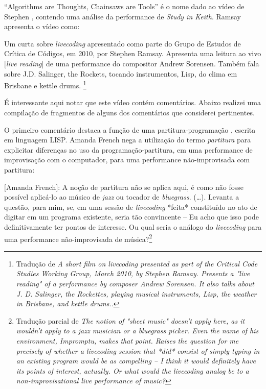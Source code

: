 \documentclass[
	12pt,				%
	openright,			%
	twoside,			%
	a4paper,			%
	english,			%
	french,				%
	spanish,			%
        italian,                        %
	brazil				%
	]{abntex2}
\begin{document}
``Algorithms are Thoughts, Chainsaws are Tools'' é o nome dado ao vídeo de Stephen , contendo uma análise da performance de \emph{Study in Keith}. Ramsay apresenta o vídeo como:

\begin{citacao}
Um curta sobre \emph{livecoding} apresentado como parte do Grupo de Estudos de Crítica de Códigos, em 2010, por Stephen Ramsay. Apresenta uma leitura ao vivo $[$\emph{live reading}$]$ de uma performance do compositor Andrew Sorensen. Também fala sobre J.D. Salinger, the Rockets, tocando instrumentos, Lisp, do clima em Brisbane e kettle drums. \footnote{Tradução de \emph{A short film on livecoding presented as part of the Critical Code Studies Working Group, March 2010, by Stephen Ramsay. Presents a "live reading" of a performance by composer Andrew Sorensen. It also talks about J. D. Salinger, the Rockettes, playing musical instruments, Lisp, the weather in Brisbane, and kettle drums.}.}
\end{citacao}
É interessante aqui notar que este vídeo contém comentários. Abaixo realizei uma compilação de fragmentos de alguns dos comentários que considerei pertinentes. 

O primeiro comentário destaca a função de uma partitura-programação \cite[p.~5]{fenerich_marulho_2014}, escrita em linguagem LISP. Amanda French nega a utilização do termo \emph{partitura} para explicitar diferenças no uso da programação-partitura, em uma performance de improvisação com o computador, para uma performance não-improvisada com partitura:

\begin{citacao}
$[$Amanda French$]$: A noção de partitura não se aplica aqui, é como não fosse possível aplicá-lo ao músico de \emph{jazz} ou tocador de \emph{bluegrass}. (\ldots). Levanta a questão, para mim, se, em uma sessão de \emph{livecoding} *feita* constituído no ato de digitar em um programa existente, seria tão convincente -- Eu acho que isso pode definitivamente ter pontos de interesse. Ou qual seria o análogo do \emph{livecoding} para uma performance não-improvisada de música?\footnote{Tradução parcial de \emph{The notion of "sheet music" doesn't apply here, as it wouldn't apply to a jazz musician or a bluegrass picker. Even the name of his environment, Impromptu, makes that point. Raises the question for me precisely of whether a livecoding session that *did* consist of simply typing in an existing program would be as compelling -- I think it would definitely have its points of interest, actually. Or what would the livecoding analog be to a non-improvisational live performance of music?}}
\end{citacao}
\end{document}
